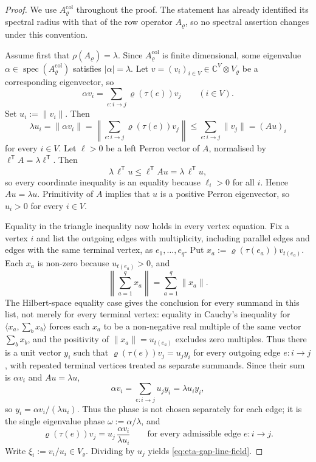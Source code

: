 \documentclass[11pt,a4paper]{amsart}
\theoremstyle{plain}
\theoremstyle{definition}
\theoremstyle{remark}
\DeclareMathOperator{\spec}{spec}
\newcommand{\CC}{\mathbb{C}}
\newcommand{\norm}[1]{\lVert #1 \rVert}
\begin{document}
\begin{proof}
  We use \(A_\varrho^{\mathrm{col}}\) throughout the proof. The statement
  has already identified its spectral radius with that of the row
  operator \(A_\varrho\), so no spectral assertion changes under this
  convention.

  Assume first that \(\rho(A_\varrho)=\lambda\). Since
  \(A_\varrho^{\mathrm{col}}\) is finite dimensional, some eigenvalue
  \(\alpha\in\spec(A_\varrho^{\mathrm{col}})\) satisfies
  \(|\alpha|=\lambda\). Let
  \(v=(v_i)_{i\in V}\in \CC^V\otimes V_\varrho\) be a corresponding
  eigenvector, so
  \[
    \alpha v_i=\sum_{e:i\to j}\varrho(\tau(e))v_j
    \qquad (i\in V).
  \]
  Set \(u_i:=\norm{v_i}\). Then
  \[
    \lambda u_i
    =
    \norm{\alpha v_i}
    =
    \left\|\sum_{e:i\to j}\varrho(\tau(e))v_j\right\|
    \le
    \sum_{e:i\to j}\norm{v_j}
    =(Au)_i
  \]
  for every \(i\in V\). Let \(\ell>0\) be a left Perron vector of
  \(A\), normalised by \(\ell^{\mathsf T}A=\lambda\ell^{\mathsf T}\).
  Then
  \[
    \lambda\,\ell^{\mathsf T}u
    \le
    \ell^{\mathsf T}Au
    =
    \lambda\,\ell^{\mathsf T}u,
  \]
  so every coordinate inequality is an equality because \(\ell_i>0\)
  for all \(i\). Hence \(Au=\lambda u\). Primitivity of \(A\) implies
  that \(u\) is a positive Perron eigenvector, so \(u_i>0\) for every
  \(i\in V\).

  Equality in the triangle inequality now holds in every vertex equation.
  Fix a vertex \(i\) and list the outgoing edges with multiplicity, including
  parallel edges and edges with the same terminal vertex, as
  \(e_1,
  \ldots,e_q\).  Put
  \(x_a:=\varrho(\tau(e_a))v_{t(e_a)}\).  Each \(x_a\) is non-zero because
  \(u_{t(e_a)}>0\), and
  \[
    \left\|\sum_{a=1}^q x_a\right\|=
    \sum_{a=1}^q\|x_a\| .
  \]
  The Hilbert-space equality case gives the conclusion for every summand in
  this list, not merely for every terminal vertex: equality in Cauchy's
  inequality for
  \(\langle x_a,\sum_bx_b\rangle\) forces each \(x_a\) to be a non-negative
  real multiple of the same vector \(\sum_bx_b\), and the positivity of
  \(\|x_a\|=u_{t(e_a)}\) excludes zero multiples.  Thus there is a unit
  vector \(y_i\) such that
  \(\varrho(\tau(e))v_j=u_jy_i\) for every outgoing edge \(e:i\to j\), with
  repeated terminal vertices treated as separate summands. Since their sum is
  \(\alpha v_i\) and \(Au=\lambda u\),
  \[
    \alpha v_i
    =\sum_{e:i\to j}u_jy_i
    =\lambda u_i y_i,
  \]
  so \(y_i=\alpha v_i/(\lambda u_i)\).  Thus the phase is not chosen
  separately for each edge; it is the single eigenvalue phase
  \(\omega:=\alpha/\lambda\), and
  \[
    \varrho(\tau(e))v_j
    =
    u_j\,\frac{\alpha v_i}{\lambda u_i}
    \qquad
    \text{for every admissible edge } e:i\to j.
  \]
  Write \(\xi_i:=v_i/u_i\in V_\varrho\). Dividing by \(u_j\) yields
  \eqref{eq:eta-gap-line-field}.


\end{proof}
\end{document}
